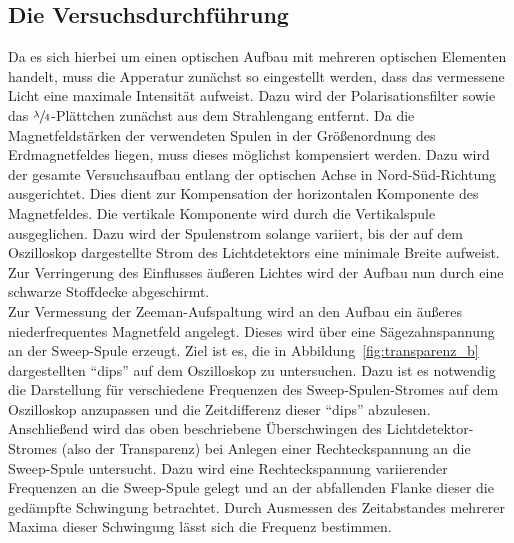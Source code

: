 \subsection{Die Versuchsdurchführung}

Da es sich hierbei um einen optischen Aufbau mit mehreren optischen Elementen
handelt, muss die Apperatur zunächst so eingestellt werden, dass das vermessene
Licht eine maximale Intensität aufweist. Dazu wird der Polarisationsfilter
sowie das $\sfrac{\lambda}{4}$-Plättchen zunächst aus dem Strahlengang entfernt.
Da die Magnetfeldstärken der verwendeten Spulen in der Größenordnung des
Erdmagnetfeldes liegen, muss dieses möglichst kompensiert werden. Dazu wird der
gesamte Versuchsaufbau entlang der optischen Achse in Nord-Süd-Richtung
ausgerichtet. Dies dient zur Kompensation der horizontalen Komponente des
Magnetfeldes. Die vertikale Komponente wird durch die Vertikalspule
ausgeglichen. Dazu wird der Spulenstrom solange variiert, bis der auf dem
Oszilloskop dargestellte Strom des Lichtdetektors eine minimale Breite aufweist.
Zur Verringerung des Einflusses äußeren Lichtes wird der Aufbau nun durch eine
schwarze Stoffdecke abgeschirmt.\\ Zur Vermessung der Zeeman-Aufspaltung wird an
den Aufbau ein äußeres niederfrequentes Magnetfeld angelegt. Dieses wird über
eine Sägezahnspannung an der Sweep-Spule erzeugt. Ziel ist es, die in
Abbildung~\ref{fig:transparenz_b} dargestellten \enquote{dips} auf dem
Oszilloskop zu untersuchen. Dazu ist es notwendig die Darstellung für
verschiedene Frequenzen des Sweep-Spulen-Stromes auf dem Oszilloskop anzupassen
und die Zeitdifferenz dieser \enquote{dips} abzulesen.\\ Anschließend wird das
oben beschriebene Überschwingen des Lichtdetektor-Stromes (also der Transparenz)
bei Anlegen einer Rechteckspannung an die Sweep-Spule untersucht. Dazu wird eine
Rechteckspannung variierender Frequenzen an die Sweep-Spule gelegt und an der
abfallenden Flanke dieser die gedämpfte Schwingung betrachtet. Durch Ausmessen
des Zeitabstandes mehrerer Maxima dieser Schwingung lässt sich die Frequenz
bestimmen.
